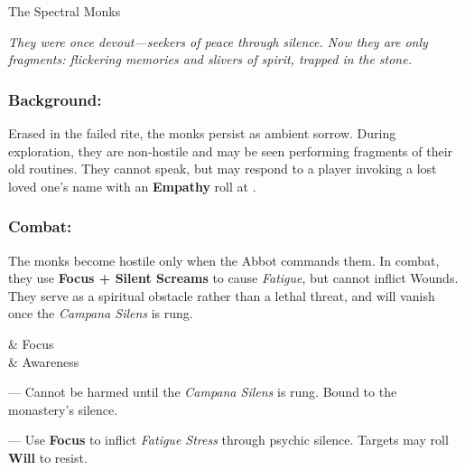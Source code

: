 \BeginBoxPage
\begin{multicols}{2}
\begin{NPC}[%
	description=Lingering echoes bound in silence,%
]{The Spectral Monks}

    \raggedright

    \emph{They were once devout—seekers of peace through silence. Now they are only fragments: flickering memories and slivers of spirit, trapped in the stone. }

    \subsubsection*{Background:}
    Erased in the failed rite, the monks persist as ambient sorrow. During exploration, they are non-hostile and may be seen performing fragments of their old routines. They cannot speak, but may respond to a player invoking a lost loved one’s name with an \textbf{Empathy} roll at .

    \subsubsection*{Combat:}
    The monks become hostile only when the Abbot commands them. In combat, they use \textbf{Focus + Silent Screams} to cause \emph{Fatigue}, but cannot inflict Wounds. They serve as a spiritual obstacle rather than a lethal threat, and will vanish once the \emph{Campana Silens} is rung.

    \vspace{0.5\baselineskip}

    \begin{SkillsBox}
        \Skilled & Focus \\
        \Novice & Awareness \\
    \end{SkillsBox}

    \begin{TraitsBox}
        \item[Spectral Silence] — Cannot be harmed until the \emph{Campana Silens} is rung. Bound to the monastery's silence.
        \item[Silent Screams] — Use \textbf{Focus} to inflict \emph{Fatigue Stress} through psychic silence. Targets may roll \textbf{Will} to resist.
    \end{TraitsBox}

    \DamageBox[%
        totalfatigue=3,%
        totalmild=0,%
        totalmoderate=0,%
        totalsevere=0,%
    ]


\end{NPC}
\end{multicols}
